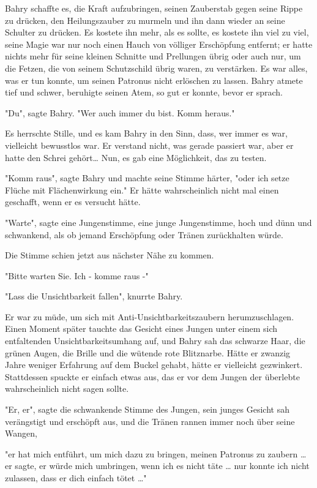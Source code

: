 {Bahry schaffte es, die Kraft aufzubringen, seinen Zauberstab gegen seine Rippe zu drücken, den Heilungszauber zu murmeln und ihn dann wieder an seine Schulter zu drücken. Es kostete ihn mehr, als es sollte, es kostete ihn viel zu viel, seine Magie war nur noch einen Hauch von völliger Erschöpfung entfernt; er hatte nichts mehr für seine kleinen Schnitte und Prellungen übrig oder auch nur, um die Fetzen, die von seinem Schutzschild übrig waren, zu verstärken. Es war alles, was er tun konnte, um seinen Patronus nicht erlöschen zu lassen. Bahry atmete tief und schwer, beruhigte seinen Atem, so gut er konnte, bevor er sprach.

"Du", sagte Bahry. "Wer auch immer du bist. Komm heraus."

Es herrschte Stille, und es kam Bahry in den Sinn, dass, wer immer es war, vielleicht bewusstlos war. Er verstand nicht, was gerade passiert war, aber er hatte den Schrei gehört… Nun, es gab eine Möglichkeit, das zu testen.

"Komm raus", sagte Bahry und machte seine Stimme härter, "oder ich setze Flüche mit Flächenwirkung ein." Er hätte wahrscheinlich nicht mal einen geschafft, wenn er es versucht hätte.

"Warte", sagte eine Jungenstimme, eine junge Jungenstimme, hoch und dünn und schwankend, als ob jemand Erschöpfung oder Tränen zurückhalten würde.

Die Stimme schien jetzt aus nächster Nähe zu kommen.

"Bitte warten Sie. Ich - komme raus -"

"Lass die Unsichtbarkeit fallen", knurrte Bahry.

Er war zu müde, um sich mit Anti-Unsichtbarkeitszaubern herumzuschlagen. Einen Moment später tauchte das Gesicht eines Jungen unter einem sich entfaltenden Unsichtbarkeitsumhang auf, und Bahry sah das schwarze Haar, die grünen Augen, die Brille und die wütende rote Blitznarbe. Hätte er zwanzig Jahre weniger Erfahrung auf dem Buckel gehabt, hätte er vielleicht gezwinkert. Stattdessen spuckte er einfach etwas aus, das er vor dem Jungen der überlebte wahrscheinlich nicht sagen sollte.

"Er, er", sagte die schwankende Stimme des Jungen, sein junges Gesicht sah verängstigt und erschöpft aus, und die Tränen rannen immer noch über seine Wangen,

"er hat mich entführt, um mich dazu zu bringen, meinen Patronus zu zaubern … er sagte, er würde mich umbringen, wenn ich es nicht täte … nur konnte ich nicht zulassen, dass er dich einfach tötet …"

}
